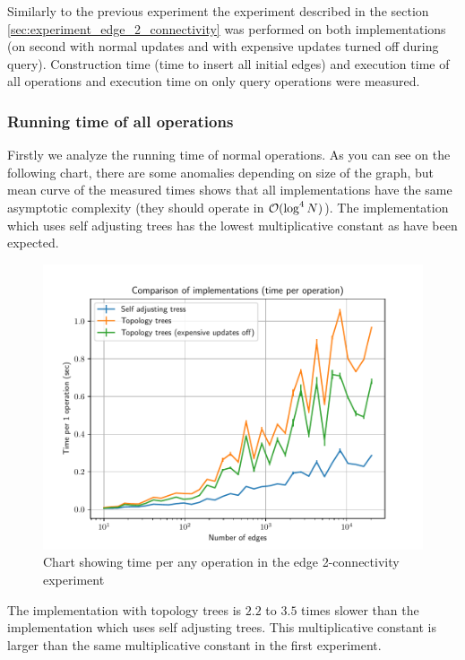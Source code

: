 Similarly to the previous experiment the experiment described in the section
\ref{sec:experiment_edge_2_connectivity} was performed on both implementations
(on second with normal updates and with expensive updates turned off during
query). Construction time (time to insert all initial edges) and execution time
of all operations and execution time on only query operations were measured.

\subsubsection{Running time of all operations}

Firstly we analyze the running time of normal operations. As you can see on the
following chart, there are some anomalies depending on size of the graph, but
mean curve of the measured times shows that all implementations have the same
asymptotic complexity (they should operate in ${\cal O}(\log^4 N)$). The
implementation which uses self adjusting trees has the lowest multiplicative
constant as have been expected.

\begin{figure}[H]
\centering
{}\hsize
\includegraphics[width=\hsize]{charts/double_edge_connectivity_op.pdf}
\caption{Chart showing time per any operation in the edge 2-connectivity experiment}
\end{figure}

The implementation with topology trees is $2.2$ to $3.5$ times slower than the
implementation which uses self adjusting trees. This multiplicative constant is
larger than the same multiplicative constant in the first experiment.

